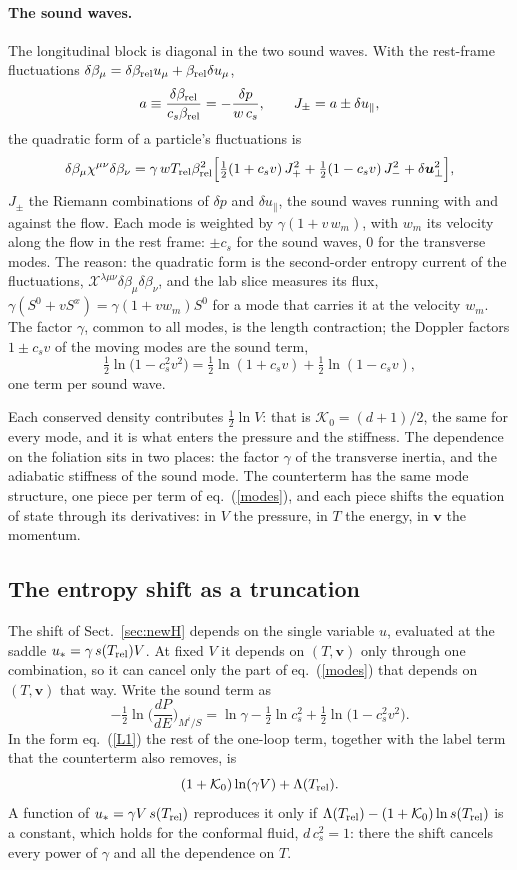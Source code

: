 \documentclass[11pt,aps,preprint,nofootinbib,superscriptaddress,tightenlines]{revtex4-2}
\def\st{\begin{equation}}
\def\stp{\end{equation}}
\def\Eq#1{eq.~(\ref{#1})}
\def\Sect#1{Sect.~\ref{#1}}
\let\oldparagraph\paragraph
\renewcommand{\paragraph}{\par\bigskip\oldparagraph}
\begin{document}
\paragraph{The sound waves.}  The longitudinal block is diagonal in the two sound waves.  With the rest-frame fluctuations $\delta\beta_\mu=\delta\beta_{\rm rel}u_\mu+\beta_{\rm rel}\delta u_\mu$,
\st
a\equiv\frac{\delta\beta_{\rm rel}}{c_s\beta_{\rm rel}}=-\frac{\delta p}{w\,c_s},\qquad J_\pm=a\pm\delta u_\parallel ,
\stp
the quadratic form of a particle's fluctuations is
\st
\delta\beta_\mu\chi^{\mu\nu}\delta\beta_\nu=\gamma\,wT_{\rm rel}\beta_{\rm rel}^2\Big[\tfrac12(1+c_sv)\,J_+^2+\tfrac12(1-c_sv)\,J_-^2+\delta\bm u_\perp^2\Big] ,
\label{Jpm}
\stp
$J_\pm$ the Riemann combinations of $\delta p$ and $\delta u_\parallel$, the sound waves running with and against the flow.  Each mode is weighted by $\gamma(1+v\,w_m)$, with $w_m$ its
velocity along the flow in the rest frame: $\pm c_s$ for the sound waves, $0$ for the transverse modes.  The reason: the quadratic form is the second-order entropy current
of the fluctuations, $\mathcal X^{\lambda\mu\nu}\delta\beta_\mu\delta\beta_\nu$, and the lab slice measures its flux, $\gamma(S^0+vS^x)=\gamma(1+vw_m)S^0$ for a mode that carries
it at the velocity $w_m$.  The factor $\gamma$, common to all modes, is the length contraction; the Doppler factors $1\pm c_sv$ of the moving modes are the sound term,
\st
\tfrac12\ln\big(1-c_s^2v^2\big)=\tfrac12\ln(1+c_sv)+\tfrac12\ln(1-c_sv) ,
\stp
one term per sound wave.

Each conserved density contributes $\tfrac12\ln V$: that is $\mathcal K_0=(d+1)/2$, the same for every mode, and it is what enters the pressure and the stiffness.  The
dependence on the foliation sits in two places: the factor $\gamma$ of the transverse inertia, and the adiabatic stiffness of the sound mode.  The counterterm has the
same mode structure, one piece per term of \Eq{modes}, and each piece shifts the equation of state through its derivatives: in $V$ the pressure, in $T$ the energy, in
$\bm v$ the momentum.

\subsection{The entropy shift as a truncation}

The shift of \Sect{sec:newH} depends on the single variable $u$, evaluated at the saddle $u_*=\gamma\,s(T_{\rm rel})V$.  At fixed $V$ it depends on $(T,\bm v)$ only through one
combination, so it can cancel only the part of \Eq{modes} that depends on $(T,\bm v)$ that way.  Write the sound term as
\st
-\tfrac12\ln\Big(\frac{dP}{dE}\Big)_{M^i/S}=\ln\gamma-\tfrac12\ln c_s^2+\tfrac12\ln\big(1-c_s^2v^2\big) .
\stp
In the form \Eq{L1} the rest of the one-loop term, together with the label term that the counterterm also removes, is
\st
(1+\mathcal K_0)\ln(\gamma V)+\Lambda(T_{\rm rel}) .
\stp
A function of $u_*=\gamma V\,s(T_{\rm rel})$ reproduces it only if $\Lambda(T_{\rm rel})-(1+\mathcal K_0)\ln s(T_{\rm rel})$ is a constant, which holds for the conformal fluid,
$d\,c_s^2=1$: there the shift cancels every power of $\gamma$ and all the dependence on $T$.
\end{document}
